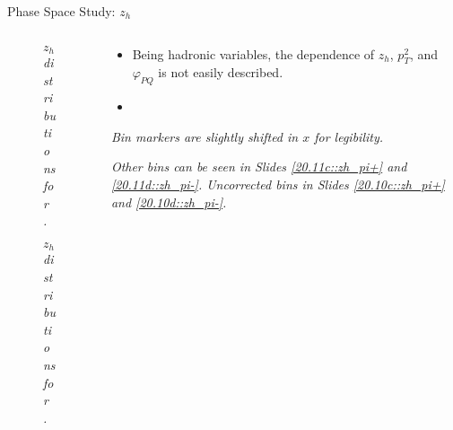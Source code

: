 \begin{frame}{Phase Space Study: $z_h$}
    \label{12.14::zh}

    \begin{columns}[onlytextwidth,T]

    \begin{column}{.44\linewidth}
        \vspace{-15pt}
        \begin{center}
            \begin{figure}[t]
                \scriptsize{\textit{$z_h$ distributions for \ef{$\pi^-$}.}}
            \end{figure}

            \vspace{-9pt}
            \begin{figure}[t]
                \scriptsize{\textit{$z_h$ distributions for \ef{$\pi^+$}.}}
            \end{figure}
        \end{center}
    \end{column}

    \begin{column}{.54\linewidth}
        \begin{itemize}
            \item
                Being hadronic variables, the \ef{$\theta$} dependence of $z_h$, $p_T^2$, and $\varphi_{PQ}$ is not easily described.

            \vspace{12pt}
            \item
        \end{itemize}

        \vspace{105pt}

        \begin{flushright}
            \tiny{\textit{Bin markers are slightly shifted in $x$ for legibility.}}

            \tiny{\textit{
                Other bins can be seen in Slides \textcolor{efd_purple}{\ref{20.11c::zh_pi+}} and \textcolor{efd_purple}{\ref{20.11d::zh_pi-}}.
                Uncorrected bins in Slides \textcolor{efd_purple}{\ref{20.10c::zh_pi+}} and \textcolor{efd_purple}{\ref{20.10d::zh_pi-}}.
            }}
        \end{flushright}
    \end{column}

    \end{columns}
\end{frame}

